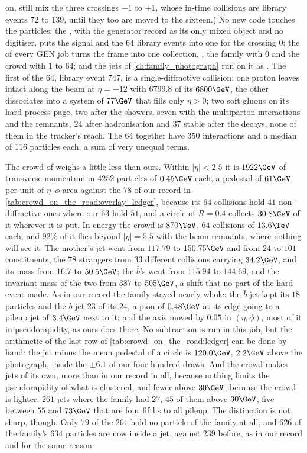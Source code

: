 on, still mix the three crossings $-1$ to $+1$, whose in-time collisions
are library events $72$ to $139$, until they too are moved to the
sixteen.) No new code touches the particles: the \Mix, with the generator
record as its only mixed object and no digitiser, puts the signal and the
$64$ library events into one  for the crossing $0$;
the  of every GEN job turns the frame into one
collection, , the family with  $0$
and the crowd with $1$ to $64$; and the jets of \cref{ch:family_photograph}
run on it as . The first of the $64$, library event
$747$, is a single-diffractive collision: one proton leaves intact along
the beam at $\eta=-12$ with $6799.8$ of its $6800\GeV$, the other
dissociates into a system of $77\GeV$ that fills only $\eta>0$; two soft
gluons on its hard-process page, two after the showers, seven with the
multiparton interactions and the remnants, $24$ after hadronisation and
$37$ stable after the decays, none of them in the tracker's reach. The
$64$ together have $350$ interactions and a median of $116$ particles
each, a sum of very unequal terms.

The crowd of \CMSSW weighs a little less than ours. Within $|\eta|<2.5$
it is $1922\GeV$ of transverse momentum in $4252$ particles of $0.45\GeV$
each, a pedestal of $61\GeV$ per unit of $\eta$--$\phi$ area against the
$78$ of our record in \cref{tab:crowd_on_the_road:overlay_ledger},
because its $64$ collisions hold $41$ non-diffractive ones where our $63$
hold $51$, and a circle of $R=0.4$ collects $30.8\GeV$ of it wherever it
is put. In energy the crowd is $870\TeV$, $64$ collisions of $13.6\TeV$
each, and $92\%$ of it flies beyond $|\eta|=5.5$ with the beam remnants,
where nothing will see it. The mother's jet went from $117.79$ to
$150.75\GeV$ and from $24$ to $101$ constituents, the $78$ strangers from
$33$ different collisions carrying $34.2\GeV$, and its mass from $16.7$ to
$50.5\GeV$; the $\bar b$'s went from $115.94$ to $144.69$, and the
invariant mass of the two from $387$ to $505\GeV$, a shift that no part of
the hard event made. As in our record the family stayed nearly whole: the
$\bar b$ jet kept its $18$ particles and the $b$ jet $23$ of its $24$, a
pion of $0.48\GeV$ at its edge going to a pileup jet of $3.4\GeV$ next to
it; and the axis moved by $0.05$ in $(\eta,\phi)$, most of it in
pseudorapidity, as ours does there. No subtraction is run in this job,
but the arithmetic of the last \CMSSW row of
\cref{tab:crowd_on_the_road:ledger} can be done by hand: the jet minus the
mean pedestal of a circle is $120.0\GeV$, $2.2\GeV$ above the photograph,
inside the $\pm6.1$ of our four hundred draws. And the crowd makes jets of
its own, more than in our record in all, because nothing limits the
pseudorapidity of what is clustered, and fewer above $30\GeV$, because the
crowd is lighter: $261$ jets where the family had $27$, $45$ of them above
$30\GeV$, five between $55$ and $73\GeV$ that are four fifths to all
pileup. The distinction is not sharp, though. Only $79$ of the $261$ hold
no particle of the family at all, and $626$ of the family's $634$
particles are now inside a jet, against $239$ before, as in our record and
for the same reason.

